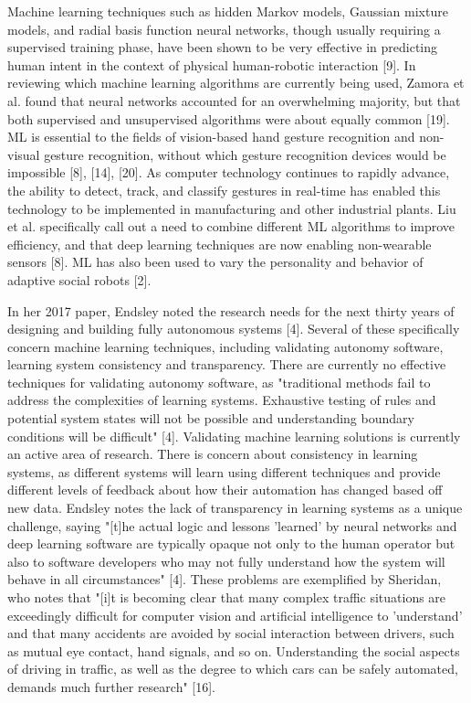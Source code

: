 Machine learning techniques such as hidden Markov models, Gaussian mixture models, and radial basis function neural networks, though usually requiring a supervised training phase, have been shown to be very effective in predicting human intent in the context of physical human-robotic interaction [9]. In reviewing which machine learning algorithms are currently being used, Zamora et al. found that neural networks accounted for an overwhelming majority, but that both supervised and unsupervised algorithms were about equally common [19]. ML is essential to the fields of vision-based hand gesture recognition and non-visual gesture recognition, without which gesture recognition devices would be impossible [8], [14], [20]. As computer technology continues to rapidly advance, the ability to detect, track, and classify gestures in real-time has enabled this technology to be implemented in manufacturing and other industrial plants. Liu et al. specifically call out a need to combine different ML algorithms to improve efficiency, and that deep learning techniques are now enabling non-wearable sensors [8]. ML has also been used to vary the personality and behavior of adaptive social robots [2].

In her 2017 paper, Endsley noted the research needs for the next thirty years of designing and building fully autonomous systems [4]. Several of these specifically concern machine learning techniques, including validating autonomy software, learning system consistency and transparency. There are currently no effective techniques for validating autonomy software, as "traditional methods fail to address the complexities of learning systems. Exhaustive testing of rules and potential system states will not be possible and understanding boundary conditions will be difficult" [4]. Validating machine learning solutions is currently an active area of research. There is concern about consistency in learning systems, as different systems will learn using different techniques and provide different levels of feedback about how their automation has changed based off new data. Endsley notes the lack of transparency in learning systems as a unique challenge, saying "[t]he actual logic and lessons 'learned' by neural networks and deep learning software are typically opaque not only to the human operator but also to software developers who may not fully understand how the system will behave in all circumstances" [4]. These problems are exemplified by Sheridan, who notes that "[i]t is becoming clear that many complex traffic situations are exceedingly difficult for computer vision and artificial intelligence to 'understand' and that many accidents are avoided by social interaction between drivers, such as mutual eye contact, hand signals, and so on. Understanding the social aspects of driving in traffic, as well as the degree to which cars can be safely automated, demands much further research" [16].

